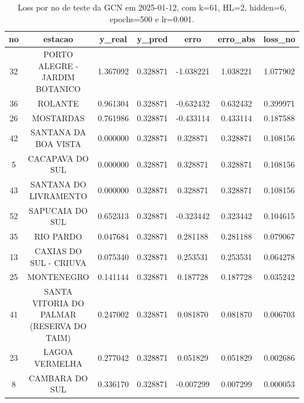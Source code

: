 \begin{table}[h]
\centering
\caption{Loss por no de teste da GCN em 2025-01-12, com k=61, HL=2, hidden=6, epochs=500 e lr=0.001.}
\label{tab:gcn_loss_k61_hl2_h6_e500_d20250112}
\begin{tabular}{ccccccc}
\toprule
no & estacao & y\_real & y\_pred & erro & erro\_abs & loss\_no \\
\midrule
32 & PORTO ALEGRE - JARDIM BOTANICO & 1.367092 & 0.328871 & -1.038221 & 1.038221 & 1.077902 \\
36 & ROLANTE & 0.961304 & 0.328871 & -0.632432 & 0.632432 & 0.399971 \\
26 & MOSTARDAS & 0.761986 & 0.328871 & -0.433114 & 0.433114 & 0.187588 \\
42 & SANTANA DA BOA VISTA & 0.000000 & 0.328871 & 0.328871 & 0.328871 & 0.108156 \\
5 & CACAPAVA DO SUL & 0.000000 & 0.328871 & 0.328871 & 0.328871 & 0.108156 \\
43 & SANTANA DO LIVRAMENTO & 0.000000 & 0.328871 & 0.328871 & 0.328871 & 0.108156 \\
52 & SAPUCAIA DO SUL & 0.652313 & 0.328871 & -0.323442 & 0.323442 & 0.104615 \\
35 & RIO PARDO & 0.047684 & 0.328871 & 0.281188 & 0.281188 & 0.079067 \\
13 & CAXIAS DO SUL - CRIUVA & 0.075340 & 0.328871 & 0.253531 & 0.253531 & 0.064278 \\
25 & MONTENEGRO & 0.141144 & 0.328871 & 0.187728 & 0.187728 & 0.035242 \\
41 & SANTA VITORIA DO PALMAR (RESERVA DO TAIM) & 0.247002 & 0.328871 & 0.081870 & 0.081870 & 0.006703 \\
23 & LAGOA VERMELHA & 0.277042 & 0.328871 & 0.051829 & 0.051829 & 0.002686 \\
8 & CAMBARA DO SUL & 0.336170 & 0.328871 & -0.007299 & 0.007299 & 0.000053 \\
\bottomrule
\end{tabular}
\end{table}
